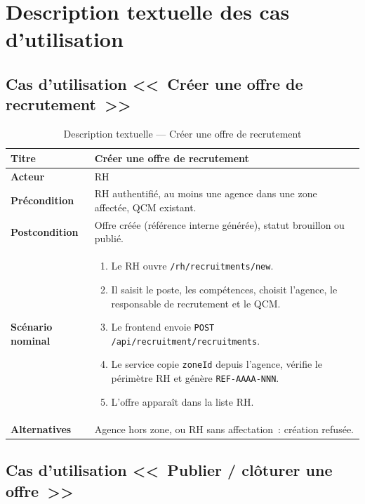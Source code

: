\section{Description textuelle des cas d'utilisation}

\subsection{Cas d'utilisation <<~Créer une offre de recrutement~>>}

\begin{table}[htbp]
  \centering
  \small
  \caption{Description textuelle --- Créer une offre de recrutement}
  \label{tab:uc-create-offer}
  \begin{tabular}{|p{3.0cm}|p{10.2cm}|}
    \hline
    \textbf{Titre} & Créer une offre de recrutement \\
    \hline
    \textbf{Acteur} & RH \\
    \hline
    \textbf{Précondition} & RH authentifié, au moins une agence dans une zone affectée, QCM existant. \\
    \hline
    \textbf{Postcondition} & Offre créée (référence interne générée), statut brouillon ou publié. \\
    \hline
    \textbf{Scénario nominal}
    &
    \begin{enumerate}[leftmargin=*,itemsep=0.15em,topsep=0.2em]
      \item Le RH ouvre \texttt{/rh/recruitments/new}.
      \item Il saisit le poste, les compétences, choisit l'agence, le
            responsable de recrutement et le QCM.
      \item Le frontend envoie \texttt{POST /api/recruitment/recruitments}.
      \item Le service copie \texttt{zoneId} depuis l'agence, vérifie le
            périmètre RH et génère \texttt{REF-AAAA-NNN}.
      \item L'offre apparaît dans la liste RH.
    \end{enumerate}
    \\
    \hline
    \textbf{Alternatives}
    & Agence hors zone, ou RH sans affectation~: création refusée. \\
    \hline
  \end{tabular}
\end{table}


\subsection{Cas d'utilisation <<~Publier / clôturer une offre~>>}

